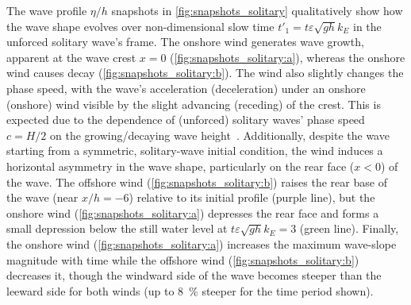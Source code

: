 \documentclass{jfm}
\renewcommand*{\epsilon}{\varepsilon}
\begin{document}
The wave profile $\eta/h$ snapshots in \cref{fig:snapshots_solitary}
qualitatively show how the wave shape evolves over non-dimensional slow
time $t'_1 = t \epsilon \sqrt{g h} k_E$ in the unforced solitary wave's
frame.
The onshore wind generates wave growth, apparent at the wave
crest $x=0$ (\cref{fig:snapshots_solitary:a}), whereas the onshore wind
causes decay (\cref{fig:snapshots_solitary:b}).
The wind also slightly changes the phase speed, with the wave's
acceleration (deceleration) under an onshore (onshore) wind visible by
the slight advancing (receding) of the crest.
This is expected due to the dependence of (unforced) solitary waves' phase
speed $c = H/2$ on the growing/decaying wave
height~\cite[\eg][]{mei2005nonlinear}.
Additionally, despite the wave starting from a symmetric, solitary-wave
initial condition, the wind induces a horizontal asymmetry in the wave
shape, particularly on the rear face ($x<0$) of the wave.
The offshore wind (\cref{fig:snapshots_solitary:b}) raises the
rear base of the wave (near $x/h = -6$) relative to its initial profile
(purple line), but the onshore wind (\cref{fig:snapshots_solitary:a})
depresses the rear face and forms a small depression below the still
water level at $t\epsilon \sqrt{gh} k_E=3$ (green line).
Finally, the onshore wind (\cref{fig:snapshots_solitary:a})
increases the maximum wave-slope magnitude with time while the offshore
wind (\cref{fig:snapshots_solitary:b}) decreases it, though the windward
side of the wave becomes steeper than the leeward side for both winds
(up to \SI{8}{\percent} steeper for the time period shown).
\end{document}

